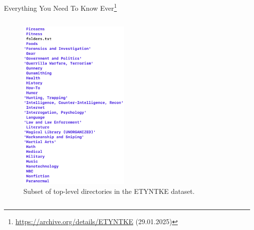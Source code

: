 \begin{frame}{Everything You Need To Know Ever\footnote{\url{https://archive.org/details/ETYNTKE} (29.01.2025)}}
\begin{columns}[T]
        \begin{column}{0.3\textwidth}
            \begin{figure}
                \includegraphics[width=\linewidth]{images/screenshot_data.png}
                \caption{Subset of top-level directories in the ETYNTKE dataset.} %
            \end{figure}
   
        \end{column}
    \end{columns}
\end{frame}

